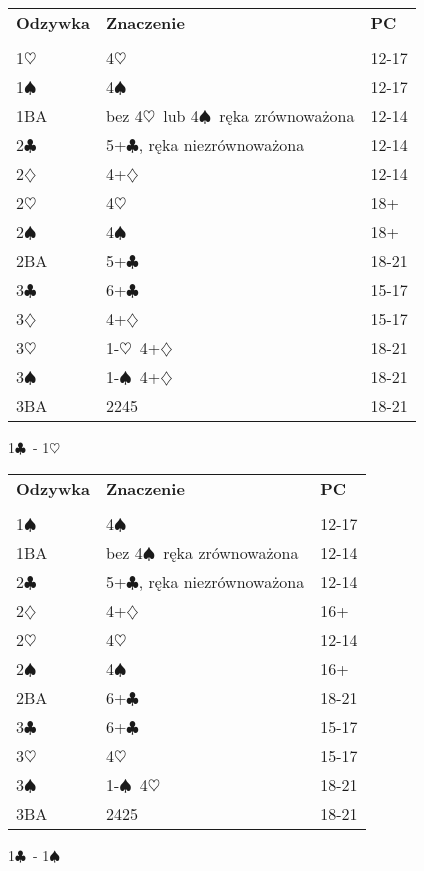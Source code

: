 \documentclass{article}
\renewcommand{\c}{\(\clubsuit\)}
\renewcommand{\d}{\(\diamondsuit\)}
\newcommand{\h}{\(\heartsuit\)}
\newcommand{\s}{\(\spadesuit\)}
\begin{document}
\begin{tabular}{p{2cm} p{10cm} l}
	\textbf{Odzywka} & \textbf{Znaczenie} & \textbf{PC}\\\\
	1\h & 4\h & 12-17 \\
	1\s & 4\s & 12-17 \\
	1BA & bez 4\h\ lub 4\s\ ręka zrównoważona & 12-14 \\
	2\c & 5+\c, ręka niezrównoważona & 12-14 \\
	2\d & 4+\d & 12-14 \\
	2\h & 4\h & 18+ \\
	2\s & 4\s & 18+ \\
	2BA & 5+\c & 18-21 \\
	3\c & 6+\c & 15-17 \\
	3\d & 4+\d & 15-17 \\
	3\h & 1-\h\ 4+\d & 18-21 \\
	3\s & 1-\s\ 4+\d & 18-21 \\
	3BA & 2245 & 18-21 
\end{tabular}
\begin{center}\LARGE{1\c\ - 1\h}
\end{center}

\begin{tabular}{p{2cm} p{10cm} l}
	\textbf{Odzywka} & \textbf{Znaczenie} & \textbf{PC}\\\\
	1\s & 4\s & 12-17 \\
	1BA & bez 4\s\ ręka zrównoważona & 12-14 \\
	2\c & 5+\c, ręka niezrównoważona & 12-14 \\
	2\d & 4+\d & 16+ \\
	2\h & 4\h & 12-14 \\
	2\s & 4\s & 16+ \\
	2BA & 6+\c & 18-21 \\
	3\c & 6+\c & 15-17 \\
	3\h & 4\h & 15-17 \\
	3\s & 1-\s\ 4\h & 18-21 \\
	3BA & 2425 & 18-21 
\end{tabular}
\newpage
\begin{center}\LARGE{1\c\ - 1\s}
\end{center}
\end{document}
